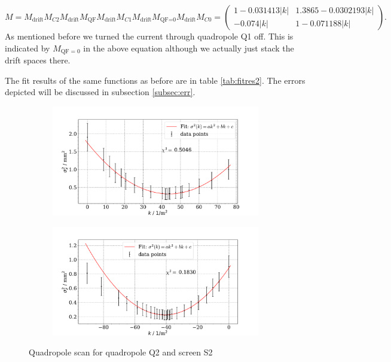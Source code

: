 \documentclass[11pt,a4paper,notitlepage]{scrartcl}
\begin{document}
$$M=M_\text{drift}M_{C2}M_\text{drift}M_\text{QF}M_{\text{drift}}M_{C1}M_\text{drift}M_\text{QF=0}M_{\text{drift}}M_{C0}=\begin{pmatrix}
	1-0.031413|k| &1.3865 - 0.0302193|k|\\
	-0.074|k| &1 - 0.071188|k|
\end{pmatrix}.$$
As mentioned before we turned the current through quadropole Q1 off. This is indicated by $M_{\text{QF}=0}$ in the above equation although we actually just stack the drift spaces there.

The fit results of the same functions as before are in table \ref{tab:fitres2}. The errors depicted will be discussed in subsection \ref{subsec:err}. 

\begin{figure}[htbp]
	\centering
	\begin{subfigure}{.49\linewidth}
		\includegraphics[width=\linewidth]{qscan_q2_x}
	\end{subfigure}
	\begin{subfigure}{.49\linewidth}
		\includegraphics[width=\linewidth]{qscan_q2_z}
	\end{subfigure}
	\caption{Quadropole scan for quadropole Q2 and screen S2}
	\label{fig:qscan2}
\end{figure}
\end{document}
